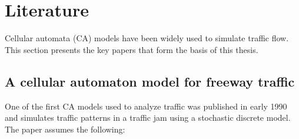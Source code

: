 \chapter{Literature}
\label{chapter:Literature}

Cellular automata (CA) models have been widely used to simulate traffic flow. This section presents the key papers that form the basis of this thesis.

\section{A cellular automaton model for freeway traffic}
\label{sec:A cellular automaton model for freeway traffic}
One of the first CA models used to analyze traffic was published in early 1990 and simulates traffic patterns in a traffic jam using a stochastic discrete model. The paper assumes the following\cite{NASCH1992}:
